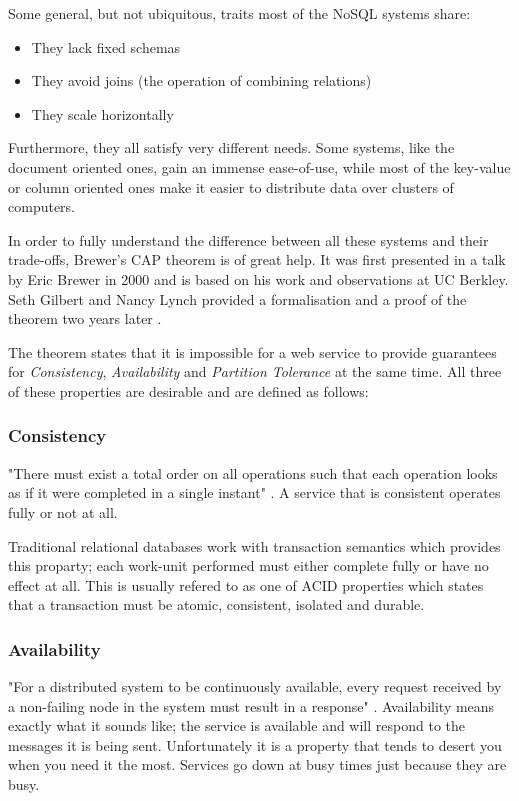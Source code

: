 Some general, but not ubiquitous, traits most of the NoSQL systems share:

\begin{itemize}
\item They lack fixed schemas
\item They avoid joins (the operation of combining relations)
\item They scale horizontally
\end{itemize}

Furthermore, they all satisfy very different needs. Some systems, like the document oriented ones, gain an immense ease-of-use, while most of the key-value or column oriented ones make it easier to distribute data over clusters of computers.

In order to fully understand the difference between all these systems and their trade-offs, Brewer's CAP theorem is of great help. It was first presented in a talk by Eric Brewer in 2000 and is based on his work and observations at UC Berkley. Seth Gilbert and Nancy Lynch provided a formalisation and a proof of the theorem two years later \cite{GilbertLynch}.

The theorem states that it is impossible for a web service to provide guarantees for \textit{Consistency}, \textit{Availability} and \textit{Partition Tolerance} at the same time. All three of these properties are desirable and are defined as follows:

\subsubsection{Consistency}

"There must exist a total order on all operations such that each operation looks as if it were completed in a single instant" \cite{GilbertLynch}. A service that is consistent operates fully or not at all. 

Traditional relational databases work with transaction semantics which provides this proparty; each work-unit performed must either complete fully or have no effect at all. This is usually refered to as one of ACID properties which states that a transaction must be atomic, consistent, isolated and durable.

\subsubsection{Availability}

"For a distributed system to be continuously available, every request received by a non-failing node in the system must result in a response" \cite{GilbertLynch}. Availability means exactly what it sounds like; the service is available and will respond to the messages it is being sent. Unfortunately it is a property that tends to desert you when you need it the most. Services go down at busy times just because they are busy.

